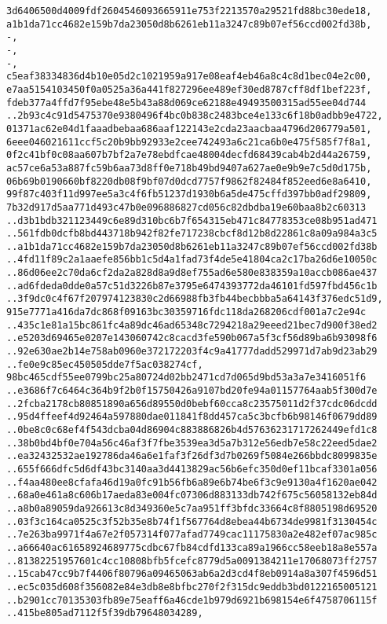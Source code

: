 \documentclass[
]{article}
\begin{document}
\begin{verbatim}
3d6406500d4009fdf2604546093665911e753f2213570a29521fd88bc30ede18,
a1b1da71cc4682e159b7da23050d8b6261eb11a3247c89b07ef56ccd002fd38b,
-,
-,
-,
c5eaf38334836d4b10e05d2c1021959a917e08eaf4eb46a8c4c8d1bec04e2c00,
e7aa5154103450f0a0525a36a441f827296ee489ef30ed8787cff8df1bef223f,
fdeb377a4ffd7f95ebe48e5b43a88d069ce62188e49493500315ad55ee04d744
..2b93c4c91d5475370e9380496f4bc0b838c2483bce4e133c6f18b0adbb9e4722,
01371ac62e04d1faaadbebaa686aaf122143e2cda23aacbaa4796d206779a501,
6eee046021611ccf5c20b9bb92933e2cee742493a6c21ca6b0e475f585f7f8a1,
0f2c41bf0c08aa607b7bf2a7e78ebdfcae48004decfd68439cab4b2d44a26759,
ac57ce6a53a887fc59b6aa73d8ff0e718b49bd9407a627ae0e9b9e7c5d0d175b,
06b69b0190660bf8220db08f9bf07d0dcd7757f9862f82484f852eed6e8a6410,
99f87c403f11d997ee5a3c4f6fb51237d1930b6a5de475cffd397bb0adf29809,
7b32d917d5aa771d493c47b0e096886827cd056c82dbdba19e60baa8b2c60313
..d3b1bdb321123449c6e89d310bc6b7f654315eb471c84778353ce08b951ad471
..561fdb0dcfb8bd443718b942f82fe717238cbcf8d12b8d22861c8a09a984a3c5
..a1b1da71cc4682e159b7da23050d8b6261eb11a3247c89b07ef56ccd002fd38b
..4fd11f89c2a1aaefe856bb1c5d4a1fad73f4de5e41804ca2c17ba26d6e10050c
..86d06ee2c70da6cf2da2a828d8a9d8ef755ad6e580e838359a10accb086ae437
..ad6fdeda0dde0a57c51d3226b87e3795e6474393772da46101fd597fbd456c1b
..3f9dc0c4f67f207974123830c2d66988fb3fb44becbbba5a64143f376edc51d9,
915e7771a416da7dc868f09163bc30359716fdc118da268206cdf001a7c2e94c
..435c1e81a15bc861fc4a89dc46ad65348c7294218a29eeed21bec7d900f38ed2
..e5203d69465e0207e143060742c8cacd3fe590b067a5f3cf56d89ba6b93098f6
..92e630ae2b14e758ab0960e372172203f4c9a41777dadd529971d7ab9d23ab29
..fe0e9c85ec450505dde7f5ac038274cf,
98bc465cdf55ee0799bc25a80724d02bb2471cd7d065d9bd53a3a7e3416051f6
..e3686f7c6464c364b9f2b0f15750426a9107bd20fe94a01157764aab5f300d7e
..2fcba2178cb80851890a656d89550d0bebf60cca8c23575011d2f37cdc06dcdd
..95d4ffeef4d92464a597880dae011841f8dd457ca5c3bcfb6b98146f0679dd89
..0be8c0c68ef4f543dcba04d86904c883886826b4d57636231717262449efd1c8
..38b0bd4bf0e704a56c46af3f7fbe3539ea3d5a7b312e56edb7e58c22eed5dae2
..ea32432532ae192786da46a6e1faf3f26df3d7b0269f5084e266bbdc8099835e
..655f666dfc5d6df43bc3140aa3d4413829ac56b6efc350d0ef11bcaf3301a056
..f4aa480ee8cfafa46d19a0fc91b56fb6a89e6b74be6f3c9e9130a4f1620ae042
..68a0e461a8c606b17aeda83e004fc07306d883133db742f675c56058132eb84d
..a8b0a89059da926613c8d349360e5c7aa951ff3bfdc33664c8f8805198d69520
..03f3c164ca0525c3f52b35e8b74f1f567764d8ebea44b6734de9981f3130454c
..7e263ba9971f4a67e2f057314f077afad7749cac11175830a2e482ef07ac985c
..a66640ac61658924689775cdbc67fb84cdfd133ca89a1966cc58eeb18a8e557a
..81382251957601c4cc10808bfb5fcefc8779d5a0091384211e17068073ff2757
..15cab47cc9b7f4406f80796a09465063ab6a2d3cd4f8eb0914a8a307f4596d51
..ec5c035d608f356082e84e3db8e8bfbc270f2f315dc9eddb3bd0122165005121
..b2901cc70135303fb89e75eaff6a46cde1b979d6921b698154e6f4758706115f
..415be805ad7112f5f39db79648034289,
\end{verbatim}
\end{document}
